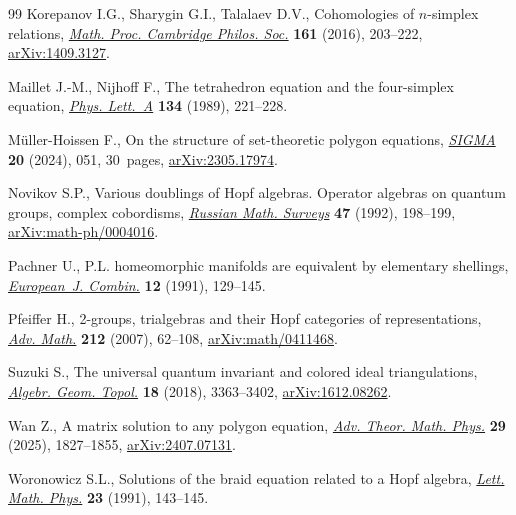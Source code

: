 \begin{thebibliography}{99}
Korepanov I.G., Sharygin G.I., Talalaev D.V., Cohomologies of {$n$}-simplex
 relations, \href{https://doi.org/10.1017/S030500411600030X}{\textit{Math.
 Proc. Cambridge Philos. Soc.}} \textbf{161} (2016), 203--222,
 \href{https://arxiv.org/abs/1409.3127}{arXiv:1409.3127}.

Maillet J.-M., Nijhoff F., The tetrahedron equation and the four-simplex
 equation, \href{https://doi.org/10.1016/0375-9601(89)90400-3}{\textit{Phys.
 Lett.~A}} \textbf{134} (1989), 221--228.

M\"{u}ller-Hoissen F., On the structure of set-theoretic polygon equations,
 \href{https://doi.org/10.3842/SIGMA.2024.051}{\textit{SIGMA}} \textbf{20}
 (2024), 051, 30~pages,
 \href{https://arxiv.org/abs/2305.17974}{arXiv:2305.17974}.

Novikov S.P., Various doublings of {H}opf algebras. {O}perator algebras on
 quantum groups, complex cobordisms,
 \href{https://doi.org/10.1070/RM1992v047n05ABEH000957}{\textit{Russian Math.
 Surveys}} \textbf{47} (1992), 198--199,
 \href{https://arxiv.org/abs/math-ph/0004016}{arXiv:math-ph/0004016}.

Pachner U., P.{L}. homeomorphic manifolds are equivalent by elementary
 shellings,
 \href{https://doi.org/10.1016/S0195-6698(13)80080-7}{\textit{European~J.
 Combin.}} \textbf{12} (1991), 129--145.

Pfeiffer H., 2-groups, trialgebras and their {H}opf categories of
 representations,
 \href{https://doi.org/10.1016/j.aim.2006.09.014}{\textit{Adv. Math.}}
 \textbf{212} (2007), 62--108,
 \href{https://arxiv.org/abs/math/0411468}{arXiv:math/0411468}.

Suzuki S., The universal quantum invariant and colored ideal triangulations,
 \href{https://doi.org/10.2140/agt.2018.18.3363}{\textit{Algebr. Geom.
 Topol.}} \textbf{18} (2018), 3363--3402,
 \href{https://arxiv.org/abs/1612.08262}{arXiv:1612.08262}.

Wan Z., A matrix solution to any polygon equation,
 \href{https://doi.org/10.4310/atmp.251120034604}{\textit{Adv. Theor. Math.
 Phys.}} \textbf{29} (2025), 1827--1855,
 \href{https://arxiv.org/abs/2407.07131}{arXiv:2407.07131}.

Woronowicz S.L., Solutions of the braid equation related to a {H}opf algebra,
 \href{https://doi.org/10.1007/BF00703727}{\textit{Lett. Math. Phys.}}
 \textbf{23} (1991), 143--145.


\end{thebibliography}
